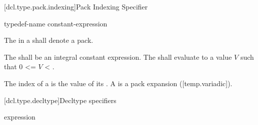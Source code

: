 \documentclass{wg21}
\begin{document}
\begin{addedblock}

[dcl.type.pack.indexing]{Pack Indexing Specifier}

\begin{bnf}
    \br
    typedef-name  \terminal{[} constant-expression \terminal{]}  \br
\end{bnf}

The  in a  shall denote a pack.

The  shall be an integral constant expression.
The  shall evaluate to a value $V$ such that 0 <= $V$ < .

The index of a  is the value of its .
A  is a pack expansion ([temp.variadic]).


\end{addedblock}



[dcl.type.decltype]{Decltype specifiers}%
%

\begin{bnf}
    \br
     \terminal{(} expression \terminal{)}
\end{bnf}
\end{document}
